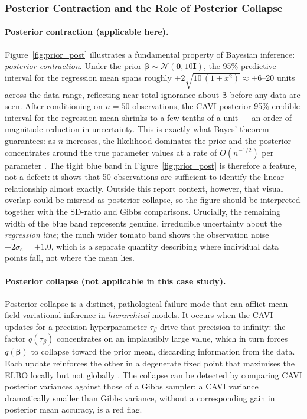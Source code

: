 \documentclass[11pt,a4paper]{article}
\newcommand{\N}{\mathcal{N}}
\begin{document}
\subsubsection{Posterior Contraction and the Role of Posterior Collapse}

\paragraph{Posterior contraction (applicable here).}
Figure~\ref{fig:prior_post} illustrates a fundamental property of Bayesian inference:
\emph{posterior contraction}.
Under the prior $\bm{\beta}\sim\N(\bm{0},10\bm{I})$, the 95\% predictive interval for
the regression mean spans roughly $\pm 2\sqrt{10\,(1+x^2)}\approx\pm 6$--20 units
across the data range, reflecting near-total ignorance about $\bm{\beta}$ before
any data are seen.
After conditioning on $n=50$ observations, the CAVI posterior 95\% credible interval
for the regression mean shrinks to a few tenths of a unit --- an order-of-magnitude
reduction in uncertainty.
This is exactly what Bayes' theorem guarantees: as $n$ increases, the likelihood
dominates the prior and the posterior concentrates around the true parameter values at
a rate of $O(n^{-1/2})$ per parameter \citep{vaart1998asymptotic}.
The tight blue band in Figure~\ref{fig:prior_post} is therefore a feature, not a
defect: it shows that 50 observations are sufficient to identify the linear
relationship almost exactly.
Outside this report context, however, that visual overlap could be misread as posterior collapse, so the figure should be interpreted together with the SD-ratio and Gibbs comparisons.
Crucially, the remaining width of the blue band represents genuine, irreducible
uncertainty about the \emph{regression line}; the much wider tomato band shows the
observation noise $\pm 2\sigma_e = \pm 1.0$, which is a separate quantity describing
where individual data points fall, not where the mean lies.

\paragraph{Posterior collapse (not applicable in this case study).}
Posterior collapse is a distinct, pathological failure mode that can afflict
mean-field variational inference in \emph{hierarchical} models.
It occurs when the CAVI updates for a precision hyperparameter $\tau_\beta$ drive
that precision to infinity: the factor $q(\tau_\beta)$ concentrates on an
implausibly large value, which in turn forces $q(\bm{\beta})$ to collapse toward
the prior mean, discarding information from the data.
Each update reinforces the other in a degenerate fixed point that maximises the ELBO
locally but not globally \citep{turner2011two}.
The collapse can be detected by comparing CAVI posterior variances against those of a
Gibbs sampler: a CAVI variance dramatically smaller than Gibbs variance, without a
corresponding gain in posterior mean accuracy, is a red flag.
\end{document}
